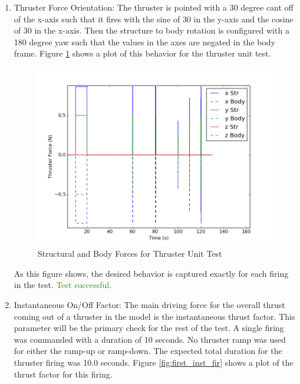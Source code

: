 \documentclass[]{LASPreport}
\begin{document}
\begin{enumerate}
\item{Thruster Force Orientation: The thruster is pointed with a 30 degree cant 
    off of the x-axis such that it fires with the sine of 30 in the y-axis 
    and the cosine of 30 in the x-axis.  Then the structure to body rotation 
    is configured with a 180 degree yaw such that the values in the axes are 
    negated in the body frame. Figure \ref{fig:force_vec_fig} shows a plot of 
    this behavior for the thruster unit test.
    \begin{figure}[htb]
            \centerline{
            \includegraphics[scale=0.5]{Figures/thrusterForceData}
            }
            \caption{Structural and Body Forces for Thruster Unit Test}
            \label{fig:force_vec_fig}
    \end{figure}
    As this figure shows, the desired behavior is captured exactly for each 
    firing in the test.  \textcolor{ForestGreen}{Test successful.}
}
\item{Instantaneous On/Off Factor:  The main driving force for the overall 
    thrust coming out of a thruster in the model is the instantaneous thrust 
    factor.  This parameter will be the primary check for the rest of the test. 
    A single firing was commanded with a duration of 10 seconds.  No thruster 
    ramp was used for either the ramp-up or ramp-down.  The expected total 
    duration for the thruster firing was 10.0 seconds.  Figure 
    \ref{fig:first_inst_fir} shows a plot of the thrust factor for this firing.
    \begin{figure}[htb]
            \centerline{
}
\end{figure}}
\end{enumerate}
\end{document}
